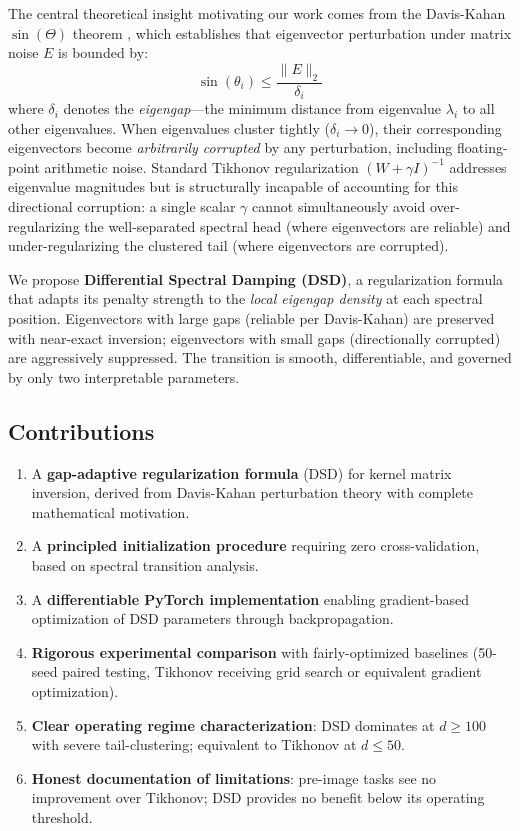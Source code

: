 \documentclass[journal]{IEEEtran}
\begin{document}
The central theoretical insight motivating our work comes from the Davis-Kahan $\sin(\Theta)$ theorem \cite{davis1970rotation}, which establishes that eigenvector perturbation under matrix noise $E$ is bounded by:
\begin{equation}
\sin(\theta_i) \leq \frac{\|E\|_2}{\delta_i}
\label{eq:davis_kahan_intro}
\end{equation}
where $\delta_i$ denotes the \emph{eigengap}---the minimum distance from eigenvalue $\lambda_i$ to all other eigenvalues. When eigenvalues cluster tightly ($\delta_i \to 0$), their corresponding eigenvectors become \emph{arbitrarily corrupted} by any perturbation, including floating-point arithmetic noise. Standard Tikhonov regularization $(W + \gamma I)^{-1}$ addresses eigenvalue magnitudes but is structurally incapable of accounting for this directional corruption: a single scalar $\gamma$ cannot simultaneously avoid over-regularizing the well-separated spectral head (where eigenvectors are reliable) and under-regularizing the clustered tail (where eigenvectors are corrupted).

We propose \textbf{Differential Spectral Damping (DSD)}, a regularization formula that adapts its penalty strength to the \emph{local eigengap density} at each spectral position. Eigenvectors with large gaps (reliable per Davis-Kahan) are preserved with near-exact inversion; eigenvectors with small gaps (directionally corrupted) are aggressively suppressed. The transition is smooth, differentiable, and governed by only two interpretable parameters.

\subsection{Contributions}

\begin{enumerate}
\item A \textbf{gap-adaptive regularization formula} (DSD) for kernel matrix inversion, derived from Davis-Kahan perturbation theory with complete mathematical motivation.
\item A \textbf{principled initialization procedure} requiring zero cross-validation, based on spectral transition analysis.
\item A \textbf{differentiable PyTorch implementation} enabling gradient-based optimization of DSD parameters through backpropagation.
\item \textbf{Rigorous experimental comparison} with fairly-optimized baselines (50-seed paired testing, Tikhonov receiving grid search or equivalent gradient optimization).
\item \textbf{Clear operating regime characterization}: DSD dominates at $d \geq 100$ with severe tail-clustering; equivalent to Tikhonov at $d \leq 50$.
\item \textbf{Honest documentation of limitations}: pre-image tasks see no improvement over Tikhonov; DSD provides no benefit below its operating threshold.
\end{enumerate}
\end{document}

